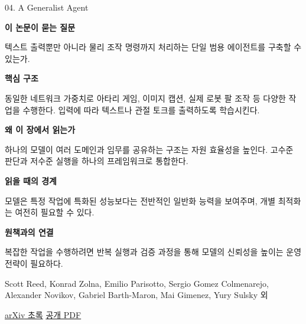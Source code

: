 \documentclass[11pt,openany]{book}
\begin{document}
\begin{termcard}{04. A Generalist Agent}

\par

\medskip

{\sffamily\bfseries\color{deepblue} 이 논문이 묻는 질문}\par

텍스트 출력뿐만 아니라 물리 조작 명령까지 처리하는 단일 범용 에이전트를 구축할 수 있는가.

\smallskip

{\sffamily\bfseries\color{deepblue} 핵심 구조}\par

동일한 네트워크 가중치로 아타리 게임, 이미지 캡션, 실제 로봇 팔 조작 등 다양한 작업을 수행한다. 입력에 따라 텍스트나 관절 토크를 출력하도록 학습시킨다.

\smallskip

{\sffamily\bfseries\color{deepblue} 왜 이 장에서 읽는가}\par

하나의 모델이 여러 도메인과 임무를 공유하는 구조는 자원 효율성을 높인다. 고수준 판단과 저수준 실행을 하나의 프레임워크로 통합한다.

\smallskip

{\sffamily\bfseries\color{coral} 읽을 때의 경계}\par

모델은 특정 작업에 특화된 성능보다는 전반적인 일반화 능력을 보여주며, 개별 최적화는 여전히 필요할 수 있다.

\smallskip

{\sffamily\bfseries\color{teal} 원책과의 연결}\par

복잡한 작업을 수행하려면 반복 실행과 검증 과정을 통해 모델의 신뢰성을 높이는 운영 전략이 필요하다.

\medskip

{\footnotesize\color{muted} Scott Reed, Konrad Zolna, Emilio Parisotto, Sergio Gomez Colmenarejo, Alexander Novikov, Gabriel Barth-Maron, Mai Gimenez, Yury Sulsky 외\par

\href{https://arxiv.org/abs/2205.06175}{arXiv 초록} \quad \href{https://arxiv.org/pdf/2205.06175}{공개 PDF}\par}

\end{termcard}
\end{document}

